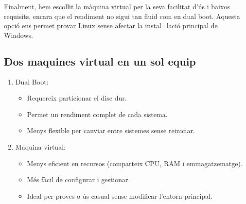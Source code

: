 Finalment, hem escollit la màquina virtual per la seva facilitat d’ús i baixos requisits, encara que el rendiment no sigui tan fluid com en dual boot. Aquesta opció ens permet provar Linux sense afectar la instal·lació principal de Windows.

\subsection{Dos maquines virtual en un sol equip}

\begin{enumerate}
 \item Dual Boot:
      \begin{itemize}
       \item Requereix particionar el disc dur.
       \item Permet un rendiment complet de cada sistema.
       \item Menys flexible per canviar entre sistemes sense reiniciar.
      \end{itemize}

  \item Maquina virtual:
        \begin{itemize}
         \item Menys eficient en recursos (comparteix CPU, RAM i emmagatzematge).
         \item Més fàcil de configurar i gestionar.
         \item Ideal per proves o ús casual sense modificar l’entorn principal.
        \end{itemize}


\end{enumerate}









